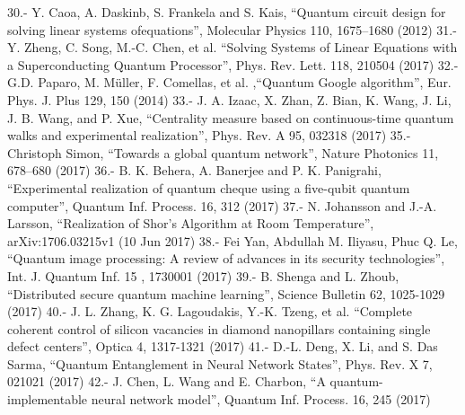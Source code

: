 30.- Y. Caoa, A. Daskinb, S. Frankela and S. Kais, “Quantum circuit design for solving linear systems ofequations”, Molecular Physics 110, 1675–1680 (2012)
31.- Y. Zheng, C. Song, M.-C. Chen, et al. “Solving Systems of Linear Equations with a Superconducting Quantum Processor”, Phys. Rev. Lett. 118, 210504 (2017)
32.- G.D. Paparo, M. Müller, F. Comellas, et al. ,“Quantum Google algorithm”, Eur. Phys. J. Plus 129, 150 (2014)
33.- J. A. Izaac, X. Zhan, Z. Bian, K. Wang, J. Li, J. B. Wang, and P. Xue, “Centrality measure based on continuous-time quantum walks and experimental realization”, Phys. Rev. A 95, 032318 (2017)
35.- Christoph Simon, “Towards a global quantum network”, Nature Photonics 11, 678–680 (2017)
36.- B. K. Behera, A. Banerjee and P. K. Panigrahi, “Experimental realization of quantum cheque using a five-qubit quantum computer”, Quantum Inf. Process. 16, 312 (2017)
37.- N. Johansson and J.-A. Larsson, “Realization of Shor’s Algorithm at Room Temperature”, arXiv:1706.03215v1 (10 Jun 2017)
38.- Fei Yan, Abdullah M. Iliyasu, Phuc Q. Le, “Quantum image processing: A review of advances in its security technologies”, Int. J. Quantum Inf. 15 , 1730001 (2017)
39.- B. Shenga and L. Zhoub, “Distributed secure quantum machine learning”, Science Bulletin 62, 1025-1029 (2017)
40.- J. L. Zhang, K. G. Lagoudakis, Y.-K. Tzeng, et al. “Complete coherent control of silicon vacancies in diamond nanopillars containing single defect centers”, Optica 4, 1317-1321 (2017)
41.- D.-L. Deng, X. Li, and S. Das Sarma, “Quantum Entanglement in Neural Network States”, Phys.  Rev. X 7, 021021 (2017)
42.- J. Chen, L. Wang and E. Charbon, “A quantum-implementable neural network model”, Quantum Inf. Process. 16, 245 (2017)
